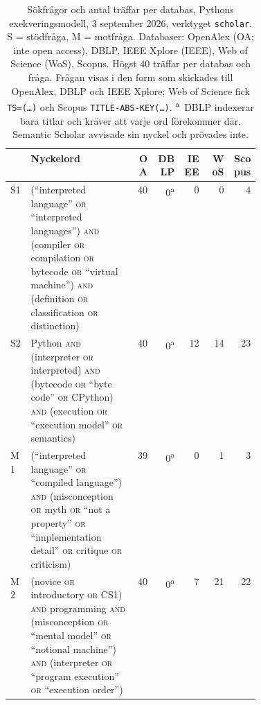 \begin{table}[!htb]
  \caption{Sökfrågor och antal träffar per databas, Pythons
    exekveringsmodell, 3 september 2026, verktyget \texttt{scholar}.
    S = stödfråga, M = motfråga.  Databaser: OpenAlex (OA; inte
    \foreignlanguage{english}{open access}), DBLP, IEEE Xplore (IEEE),
    Web of Science (WoS), Scopus.  Högst 40 träffar per databas och fråga.
    Frågan visas i den form som skickades till OpenAlex, DBLP och IEEE
    Xplore; Web of Science fick \texttt{TS=(\dots)} och Scopus
    \texttt{TITLE-ABS-KEY(\dots)}.  \textsuperscript{a}~DBLP indexerar
    bara titlar och kräver att varje ord förekommer där.  Semantic
    Scholar avvisade sin nyckel och prövades inte.}
  \label{tab:sok-queries-py}
    \centering\footnotesize
    \begin{tabular}{@{}lp{0.42\linewidth}rrrrr@{}}
      \toprule
      & Nyckelord & OA & DBLP & IEEE & WoS & Scopus \\
      \midrule
      S1 & (\enquote{interpreted language} \textsc{or} \enquote{interpreted
           languages}) \textsc{and} (compiler \textsc{or} compilation
           \textsc{or} bytecode \textsc{or} \enquote{virtual machine})
           \textsc{and} (definition \textsc{or} classification \textsc{or}
           distinction)
         & 40 & 0\textsuperscript{a} & 0 & 0 & 4 \\
      S2 & Python \textsc{and} (interpreter \textsc{or} interpreted)
           \textsc{and} (bytecode \textsc{or} \enquote{byte code}
           \textsc{or} CPython) \textsc{and} (execution \textsc{or}
           \enquote{execution model} \textsc{or} semantics)
         & 40 & 0\textsuperscript{a} & 12 & 14 & 23 \\
      \midrule
      M1 & (\enquote{interpreted language} \textsc{or} \enquote{compiled
           language}) \textsc{and} (misconception \textsc{or} myth
           \textsc{or} \enquote{not a property} \textsc{or}
           \enquote{implementation detail} \textsc{or} critique
           \textsc{or} criticism)
         & 39 & 0\textsuperscript{a} & 0 & 1 & 3 \\
      M2 & (novice \textsc{or} introductory \textsc{or} CS1) \textsc{and}
           programming \textsc{and} (misconception \textsc{or}
           \enquote{mental model} \textsc{or} \enquote{notional machine})
           \textsc{and} (interpreter \textsc{or} \enquote{program
           execution} \textsc{or} \enquote{execution order})
         & 40 & 0\textsuperscript{a} & 7 & 21 & 22 \\
      \bottomrule
    \end{tabular}
\end{table}

